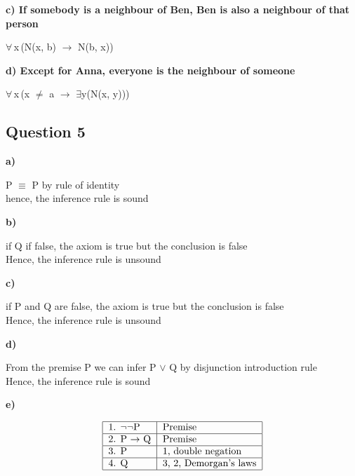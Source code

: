 \documentclass[11pt]{article}
\begin{document}
{\noindent
\textbf{c) If somebody is a neighbour of Ben, Ben is also a neighbour of that person}
\par\parindent 20pt
$\forall$\,x\,(N(x, b) $\rightarrow$ N(b, x))

\noindent
\textbf{d) Except for Anna, everyone is the neighbour of someone}
\par\parindent 20pt
$\forall$\,x\,(x $\neq$ a $\rightarrow$ $\exists$y(N(x, y)))

\subsection*{Question 5}

\noindent
\textbf{a)} 

P $\equiv$ P by rule of identity\\
\indent
hence, the inference rule is sound
\parskip 6mm

\noindent
\textbf{b)} 

if Q if false, the axiom is true but the conclusion is false\\
\indent
Hence, the inference rule is unsound

\noindent
\textbf{c)} 

if P and Q are false, the axiom is true but the conclusion is false\\
\indent
Hence, the inference rule is unsound

\noindent
\textbf{d)} 

From the premise P we can infer P $\lor$ Q by disjunction introduction rule\\
\indent
Hence, the inference rule is sound

\pagebreak
\noindent
\textbf{e)} 

\setlength{\tabcolsep}{1em} %
{\renewcommand{\arraystretch}{1.5}%
\begin{displaymath}
    \begin{tabular}{| l | l |}
        \hline
        1. $\neg$$\neg$P & Premise \\
        \hline
        2. P $\rightarrow$ Q & Premise \\
        \hline
        3. P & 1, double negation \\
        \hline
        4. Q & 3, 2, Demorgan's laws\\
        \hline
    \end{tabular}
\end{displaymath}

}}
\end{document}
